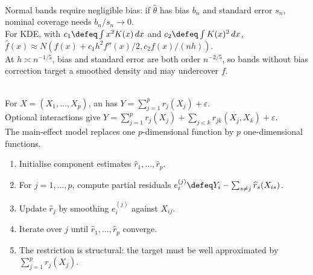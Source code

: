 \begin{remark} \label{rem:curve-confidence-bands-bias-warning} \\
Normal bands require negligible bias: if $\widehat\theta$ has bias $b_n$ and standard error $s_n$, nominal coverage needs $b_n/s_n\to0$.\\
For KDE, with $c_1\defeq\int x^2K(x)\,dx$ and $c_2\defeq\int K(x)^2\,dx$, $\widehat f(x)\approx N(f(x)+c_1h^2f''(x)/2,c_2f(x)/(nh))$.\\
At $h\asymp n^{-1/5}$, bias and standard error are both order $n^{-2/5}$, so bands without bias correction target a smoothed density and may undercover $f$.
\end{remark}

\begin{definition} \label{def:additive-nonparametric-regression} \\
For $X=(X_1,\ldots,X_p)$, an  has $Y=\sum_{j=1}^{p}r_j(X_j)+\varepsilon$.\\
Optional interactions give $Y=\sum_{j=1}^{p}r_j(X_j)+\sum_{j<k}r_{jk}(X_j,X_k)+\varepsilon$.\\
The main-effect model replaces one $p$-dimensional function by $p$ one-dimensional functions.
\end{definition}

\begin{method} \label{meth:additive-regression-backfitting} 
\begin{enumerate}[label=(\roman*)]
\setlength{\itemsep}{0pt}
\item Initialise component estimates $\widehat r_1,\ldots,\widehat r_p$.
\item For $j=1,\ldots,p$, compute partial residuals $e_i^{(j)}\defeq Y_i-\sum_{s\neq j}\widehat r_s(X_{is})$.
\item Update $\widehat r_j$ by smoothing $e_i^{(j)}$ against $X_{ij}$.
\item Iterate over $j$ until $\widehat r_1,\ldots,\widehat r_p$ converge.
\item The restriction is structural: the target must be well approximated by $\sum_{j=1}^{p}r_j(X_j)$.
\end{enumerate}
\end{method}
